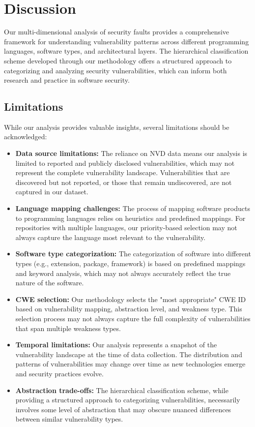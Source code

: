 \section{Discussion}

Our multi-dimensional analysis of security faults provides a comprehensive framework for understanding vulnerability patterns across different programming languages, software types, and architectural layers. The hierarchical classification scheme developed through our methodology offers a structured approach to categorizing and analyzing security vulnerabilities, which can inform both research and practice in software security.

\subsection{Limitations}

While our analysis provides valuable insights, several limitations should be acknowledged:

\begin{itemize}
    \item \textbf{Data source limitations:} The reliance on NVD data means our analysis is limited to reported and publicly disclosed vulnerabilities, which may not represent the complete vulnerability landscape. Vulnerabilities that are discovered but not reported, or those that remain undiscovered, are not captured in our dataset.

    \item \textbf{Language mapping challenges:} The process of mapping software products to programming languages relies on heuristics and predefined mappings. For repositories with multiple languages, our priority-based selection may not always capture the language most relevant to the vulnerability.

    \item \textbf{Software type categorization:} The categorization of software into different types (e.g., extension, package, framework) is based on predefined mappings and keyword analysis, which may not always accurately reflect the true nature of the software.

    \item \textbf{CWE selection:} Our methodology selects the "most appropriate" CWE ID based on vulnerability mapping, abstraction level, and weakness type. This selection process may not always capture the full complexity of vulnerabilities that span multiple weakness types.

    \item \textbf{Temporal limitations:} Our analysis represents a snapshot of the vulnerability landscape at the time of data collection. The distribution and patterns of vulnerabilities may change over time as new technologies emerge and security practices evolve.

    \item \textbf{Abstraction trade-offs:} The hierarchical classification scheme, while providing a structured approach to categorizing vulnerabilities, necessarily involves some level of abstraction that may obscure nuanced differences between similar vulnerability types.
\end{itemize}

